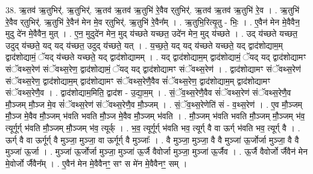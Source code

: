 \documentclass[17pt]{extarticle}
\begin{document}
38. ऋ॒तव॑ ऋ॒तुभिर्॑. ऋ॒तुभिर्॑. ऋ॒तव॑ ऋ॒तव॑ ऋ॒तुभि॑ रे॒वैव र्‌तुभिर्॑. ऋ॒तव॑ ऋ॒तव॑ ऋ॒तुभि॑ रे॒व । . ऋ॒तुभि॑ रे॒वैव र्‌तुभिर्॑. ऋ॒तुभि॑ रे॒वैन॑ मेन मे॒व र्‌तुभिर्॑. ऋ॒तुभि॑ रे॒वैन᳚म् । . ऋ॒तुभि॒रित्यृ॒तु - भिः॒ । . ए॒वैन॑ मेन मे॒वैवैन॒ मुदु दे॑न मे॒वैवैन॒ मुत् । . ए॒न॒ मुदुदे॑न मेन॒ मुद् य॑च्छते यच्छत॒ उदे॑न मेन॒ मुद् य॑च्छते । . उद् य॑च्छते यच्छत॒ उदुद् य॑च्छते॒ यद् यद् य॑च्छत॒ उदुद् य॑च्छते॒ यत् । . य॒च्छ॒ते॒ यद् यद् य॑च्छते यच्छते॒ यद् द्वाद॑शोद्याम॒म् द्वाद॑शोद्यामं॒ ॅयद् य॑च्छते यच्छते॒ यद् द्वाद॑शोद्यामम् । . यद् द्वाद॑शोद्याम॒म् द्वाद॑शोद्यामं॒ ॅयद् यद् द्वाद॑शोद्यामꣳ संॅवथ्स॒रेण॑ संॅवथ्स॒रेण॒ द्वाद॑शोद्यामं॒ ॅयद् यद् द्वाद॑शोद्यामꣳ संॅवथ्स॒रेण॑ । . द्वाद॑शोद्यामꣳ संॅवथ्स॒रेण॑ संॅवथ्स॒रेण॒ द्वाद॑शोद्याम॒म् द्वाद॑शोद्यामꣳ संॅवथ्स॒रेणै॒वैव सं॑ॅवथ्स॒रेण॒ द्वाद॑शोद्याम॒म् द्वाद॑शोद्यामꣳ संॅवथ्स॒रेणै॒व । . द्वाद॑शोद्याम॒मिति॒ द्वाद॑श - उ॒द्या॒म॒म् । . सं॒ॅव॒थ्स॒रेणै॒वैव सं॑ॅवथ्स॒रेण॑ संॅवथ्स॒रेणै॒व मौ॒ञ्जम् मौ॒ञ्ज मे॒व सं॑ॅवथ्स॒रेण॑ संॅवथ्स॒रेणै॒व मौ॒ञ्जम् । . सं॒ॅव॒थ्स॒रेणेति॑ सं - व॒थ्स॒रेण॑ । . ए॒व मौ॒ञ्जम् मौ॒ञ्ज मे॒वैव मौ॒ञ्जम् भ॑वति भवति मौ॒ञ्ज मे॒वैव मौ॒ञ्जम् भ॑वति । . मौ॒ञ्जम् भ॑वति भवति मौ॒ञ्जम् मौ॒ञ्जम् भ॑व॒ त्यूर्गूर्ग् भ॑वति मौ॒ञ्जम् मौ॒ञ्जम् भ॑व॒ त्यूर्क् । . भ॒व॒ त्यूर्गूर्ग् भ॑वति भव॒ त्यूर्ग् वै वा ऊर्ग् भ॑वति भव॒ त्यूर्ग् वै । . ऊर्ग् वै वा ऊर्गूर्ग् वै मुञ्जा॒ मुञ्जा॒ वा ऊर्गूर्ग् वै मुञ्जाः᳚ । . वै मुञ्जा॒ मुञ्जा॒ वै वै मुञ्जा॑ ऊ॒र्जोर्जा मुञ्जा॒ वै वै मुञ्जा॑ ऊ॒र्जा । . मुञ्जा॑ ऊ॒र्जोर्जा मुञ्जा॒ मुञ्जा॑ ऊ॒र्जै वैवोर्जा मुञ्जा॒ मुञ्जा॑ ऊ॒र्जैव । . ऊ॒र्जै वैवोर्जो र्जैवैन॑ मेन मे॒वोर्जो र्जैवैन᳚म् । . ए॒वैन॑ मेन मे॒वैवैनꣳ॒॒ सꣳ स मे॑न मे॒वैवैनꣳ॒॒ सम् । \newline
\end{document}
